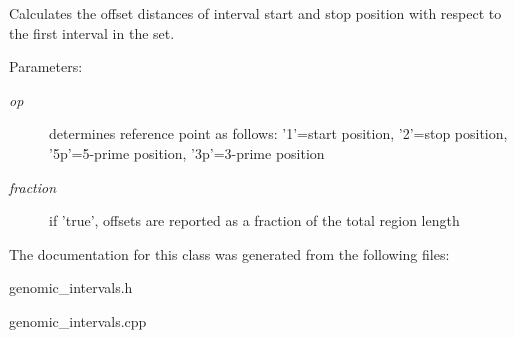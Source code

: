 Calculates the offset distances of interval start and stop position with respect to the first interval in the set. 

\begin{Desc}
\item[Parameters:]
\begin{description}
\item[{\em op}]determines reference point as follows: '1'=start position, '2'=stop position, '5p'=5-prime position, '3p'=3-prime position \item[{\em fraction}]if 'true', offsets are reported as a fraction of the total region length \end{description}
\end{Desc}


The documentation for this class was generated from the following files:\begin{CompactItemize}
\item 
genomic\_\-intervals.h\item 
genomic\_\-intervals.cpp\end{CompactItemize}
